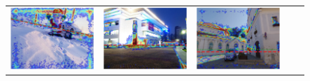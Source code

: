 \begin{figure}
\begin{tabular}{@{}c@{}c@{}c@{}c@{}c@{}}
\includegraphics[width=\sgbpwidth\linewidth]{figures/nn_analysis/sgbp/pano_addtwdtklktubg_jpg-3.png} &
\includegraphics[width=\sgbpwidth\linewidth]{figures/nn_analysis/sgbp/pano_ayflzrhzcccird_jpg-4.png} &
\includegraphics[width=\sgbpwidth\linewidth]{figures/nn_analysis/sgbp/pano_ayfpxlgzfcixnm_jpg-6.png} &

\end{tabular}
\end{figure}
